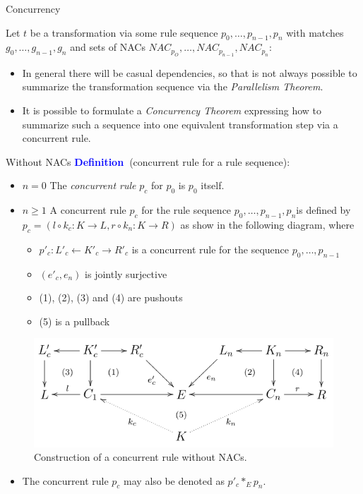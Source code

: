 \documentclass[xcolor=dvipsnames,pdf,10pt]{beamer}
\newcommand{\defn}{\textcolor{blue}{\textbf{\textrm{Definition\ }}}}
\newcommand{\rulesequence}{$p_0,\ldots,p_{n-1},p_n$}
\begin{document}
\begin{frame}[allowframebreaks]{Concurrency}

Let $t$ be a transformation via some rule sequence $p_0,\ldots,p_{n-1}, p_n$ with matches $g_0,\ldots,g_{n-1},g_n$ and sets of NACs $NAC_{p_O},\ldots, NAC_{p_{n-1}}, NAC_{p_n}$:

\begin{itemize}
\item In general there will be casual dependencies, so that is not always possible to summarize the transformation sequence via the \emph{Parallelism Theorem}.
\item It is possible to formulate a \emph{Concurrency Theorem} expressing how to summarize such a sequence into one equivalent transformation step via a concurrent rule.  
\end{itemize}

\end{frame}

\begin{frame}[allowframebreaks]{Without NACs}
\defn (concurrent rule for a rule sequence):

\begin{itemize}
\item $n = 0$ The \emph{concurrent rule} $p_c$ for $p_0$ is $p_0$ itself.
\item $n \geqslant 1$ A concurrent rule $p_c$ for the rule sequence \rulesequence is defined by $p_c = (l \circ k_c : K \rightarrow L, r \circ k_n : K \rightarrow R)$ as show in the following diagram, where 
  \begin{itemize}
  \item $p'_c : L'_c \leftarrow K'_c \rightarrow R'_c$ is a concurrent rule for the sequence $p_0,\ldots,p_{n-1}$
  \item $(e'_c,e_n)$ is jointly surjective
  \item (1), (2), (3) and (4) are pushouts
  \item (5) is a pullback
  \end{itemize}
\end{itemize}

\begin{figure}[htbp]
\centering
\includegraphics[width=1\textwidth]{fig/concurrent-rule.png}
\caption{\label{fig:concurrent-rule}Construction of a concurrent rule without NACs.}
\end{figure}

\begin{itemize}
\item The concurrent rule $p_c$ may also be denoted as $p'_c \ast_E p_n$.
\end{itemize}

\end{frame}
\end{document}
